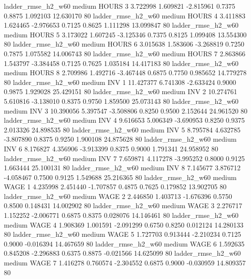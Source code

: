     ladder_rmse_h2_w60     medium    HOURS                 3  3.722998 1.609821 -2.815961 0.7375 0.8875  1.092103   12.630170 80
    ladder_rmse_h2_w60     medium    HOURS                 4  3.411883 1.624465 -2.976653 0.7125 0.8625  1.111298   13.099847 80
    ladder_rmse_h2_w60     medium    HOURS                 5  3.173022 1.607245 -3.125346 0.7375 0.8125  1.099408   13.554300 80
    ladder_rmse_h2_w60     medium    HOURS                 6  3.015638 1.583606 -3.268819 0.7250 0.7875  1.075582   14.006743 80
    ladder_rmse_h2_w60     medium    HOURS                 7  2.863866 1.543797 -3.384458 0.7125 0.7625  1.035184   14.417183 80
    ladder_rmse_h2_w60     medium    HOURS                 8  2.709986 1.492716 -3.467448 0.6875 0.7750  0.985652   14.779278 80
    ladder_rmse_h2_w60     medium      INV                 1 11.427377 6.741308 -2.633424 0.9000 0.9875  1.929028   25.429151 80
    ladder_rmse_h2_w60     medium      INV                 2 10.274761 5.610816 -3.138010 0.8375 0.9750  1.859500   25.073143 80
    ladder_rmse_h2_w60     medium      INV                 3 10.390056 5.397547 -3.508806 0.8250 0.9500  2.152644   24.961520 80
    ladder_rmse_h2_w60     medium      INV                 4  9.616653 5.006349 -3.690953 0.8250 0.9375  2.013326   24.898535 80
    ladder_rmse_h2_w60     medium      INV                 5  8.795784 4.632785 -3.807890 0.8375 0.9250  1.900108   24.875628 80
    ladder_rmse_h2_w60     medium      INV                 6  8.176827 4.356906 -3.913399 0.8375 0.9000  1.791341   24.958952 80
    ladder_rmse_h2_w60     medium      INV                 7  7.659871 4.117278 -3.995252 0.8000 0.9125  1.663444   25.100131 80
    ladder_rmse_h2_w60     medium      INV                 8  7.145677 3.876712 -4.058467 0.7500 0.9125  1.549688   25.216365 80
    ladder_rmse_h2_w60     medium     WAGE                 1  4.235998 2.451440 -1.707857 0.4875 0.7625  0.179852   13.902705 80
    ladder_rmse_h2_w60     medium     WAGE                 2  2.446850 1.403713 -1.676396 0.5750 0.8500  0.148431   14.002902 80
    ladder_rmse_h2_w60     medium     WAGE                 3  2.276717 1.152252 -2.006771 0.6875 0.8375  0.028076   14.146461 80
    ladder_rmse_h2_w60     medium     WAGE                 4  1.908369 1.001591 -2.091299 0.6750 0.8250  0.012124   14.280133 80
    ladder_rmse_h2_w60     medium     WAGE                 5  1.727703 0.913444 -2.210234 0.7125 0.9000 -0.016394   14.467659 80
    ladder_rmse_h2_w60     medium     WAGE                 6  1.592635 0.845208 -2.296883 0.6375 0.8875 -0.021566   14.625099 80
    ladder_rmse_h2_w60     medium     WAGE                 7  1.416278 0.760574 -2.304552 0.6875 0.9000 -0.030959   14.809357 80
